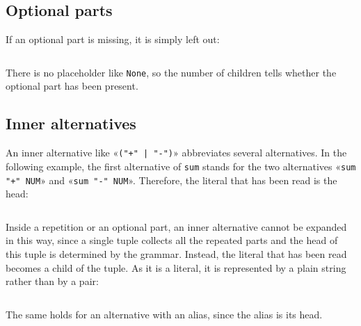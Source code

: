 \documentclass[11pt,a4paper]{article}
\newcommand{\blue}[1]{{\color{blue}#1}}
\newenvironment{unbreakable}{\par\noindent\begin{minipage}{\linewidth}}{\end{minipage}\par}
\newcommand{\resultfile}[2][\normalsize]{\begin{unbreakable}%
  \inputminted[fontsize = #1, breaklines]{text}{examples/output/#2.txt}\end{unbreakable}}
\begin{document}
\subsection{Optional parts}
If an optional part is missing, it is simply left out:
\resultfile{shapes-optional}
There is no placeholder like \texttt{None}, so the number of children tells whether the optional part has
been present.

\subsection{Inner alternatives}
\label{sec:inner-alternatives}
An \blue{inner alternative} like «\verb!("+" | "-")!» abbreviates several alternatives.  In the following
example, the first alternative of \texttt{sum} stands for the two alternatives «\verb!sum "+" NUM!» and
«\verb!sum "-" NUM!».  Therefore, the literal that has been read is the head:
\resultfile{shapes-alternatives}
Inside a repetition or an optional part, an inner alternative cannot be expanded in this way, since a single
tuple collects all the repeated parts and the head of this tuple is determined by the grammar.  Instead, the
literal that has been read becomes a child of the tuple.  As it is a literal, it is represented by a plain
string rather than by a pair:
\resultfile{shapes-alternatives-repeated}
The same holds for an alternative with an alias, since the alias is its head.
\end{document}

